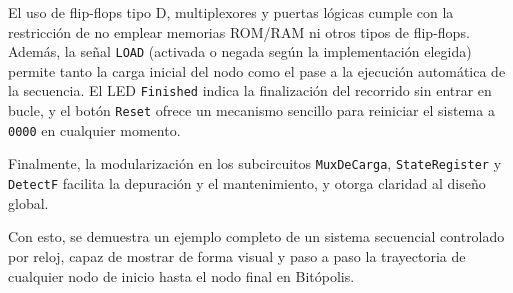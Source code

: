 \documentclass[12pt]{article}
\begin{document}
El uso de flip-flops tipo D, multiplexores y puertas lógicas cumple con la restricción de no emplear memorias ROM/RAM ni otros tipos de flip-flops. Además, la señal \texttt{LOAD} (activada o negada según la implementación elegida) permite tanto la carga inicial del nodo como el pase a la ejecución automática de la secuencia. El LED \texttt{Finished} indica la finalización del recorrido sin entrar en bucle, y el botón \texttt{Reset} ofrece un mecanismo sencillo para reiniciar el sistema a \texttt{0000} en cualquier momento.

Finalmente, la modularización en los subcircuitos \texttt{MuxDeCarga}, \texttt{StateRegister} y \texttt{DetectF} facilita la depuración y el mantenimiento, y otorga claridad al diseño global. 

Con esto, se demuestra un ejemplo completo de un sistema secuencial controlado por reloj, capaz de mostrar de forma visual y paso a paso la trayectoria de cualquier nodo de inicio hasta el nodo final en Bitópolis.
\end{document}
